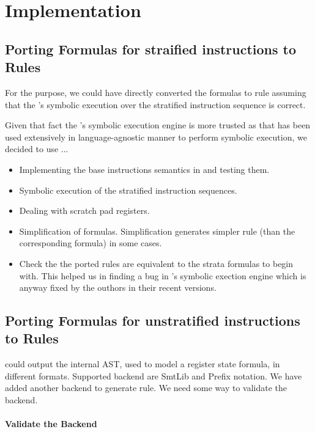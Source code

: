 \section{Implementation}

\subsection{Porting Formulas for straified instructions to \K Rules}

For the purpose, we could have directly converted the \Strata formulas
to \K rule assuming that the \Strata's symbolic execution over the 
stratified instruction sequence is correct.

Given that fact the \K's symbolic execution engine is more trusted as 
that has been used extensively in language-agnostic manner to perform symbolic
execution, we decided to use ... 

\begin{itemize}
\item Implementing the base instructions semantics in \K and testing them.
\item Symbolic execution of the stratified instruction sequences.
\item Dealing with scratch pad registers.
\item Simplification of formulas.
  Simplification generates simpler \K rule (than the corresponding \Strata formula)
  in some cases. 
\item Check the the ported \K rules are equivalent to the strata formulas to
begin with. This helped us in finding a bug in \Strata's symbolic exection 
engine which is anyway fixed by the outhors in their recent versions.

\end{itemize}

\subsection{Porting \Strata Formulas for unstratified instructions to \K Rules}

\Strata could output the internal AST, used to model a register state formula, in different
formats. Supported backend are SmtLib and Prefix notation. We have added another backend 
to generate \K rule. We need some way to validate the backend. 

\paragraph{Validate the Backend}

